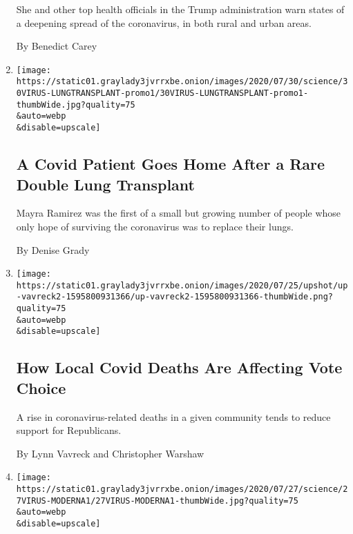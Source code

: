 \begin{enumerate}
  She and other top health officials in the Trump administration warn
  states of a deepening spread of the coronavirus, in both rural and
  urban areas.

  By Benedict Carey
\item
  \href{/2020/07/30/health/Covid-lung-transplant.html}{}

  \texttt{[image: https://static01.graylady3jvrrxbe.onion/images/2020/07/30/science/30VIRUS-LUNGTRANSPLANT-promo1/30VIRUS-LUNGTRANSPLANT-promo1-thumbWide.jpg?quality=75\\\&auto=webp\\\&disable=upscale]}

  \hypertarget{a-covid-patient-goes-home-after-a-rare-double-lung-transplant}{%
  \subsection{A Covid Patient Goes Home After a Rare Double Lung
  Transplant}\label{a-covid-patient-goes-home-after-a-rare-double-lung-transplant}}

  Mayra Ramirez was the first of a small but growing number of people
  whose only hope of surviving the coronavirus was to replace their
  lungs.

  By Denise Grady
\item
  \href{/2020/07/28/upshot/polling-trump-virus-election.html}{}

  \texttt{[image: https://static01.graylady3jvrrxbe.onion/images/2020/07/25/upshot/up-vavreck2-1595800931366/up-vavreck2-1595800931366-thumbWide.png?quality=75\\\&auto=webp\\\&disable=upscale]}

  \hypertarget{how-local-covid-deaths-are-affecting-vote-choice}{%
  \subsection{How Local Covid Deaths Are Affecting Vote
  Choice}\label{how-local-covid-deaths-are-affecting-vote-choice}}

  A rise in coronavirus-related deaths in a given community tends to
  reduce support for Republicans.

  By Lynn Vavreck and Christopher Warshaw
\item
  \href{/2020/07/27/health/moderna-vaccine-covid.html}{}

  \texttt{[image: https://static01.graylady3jvrrxbe.onion/images/2020/07/27/science/27VIRUS-MODERNA1/27VIRUS-MODERNA1-thumbWide.jpg?quality=75\\\&auto=webp\\\&disable=upscale]}

  \hypertarget{moderna-and-pfizer-begin-late-stage-vaccine-trials}{%
}
\end{enumerate}
